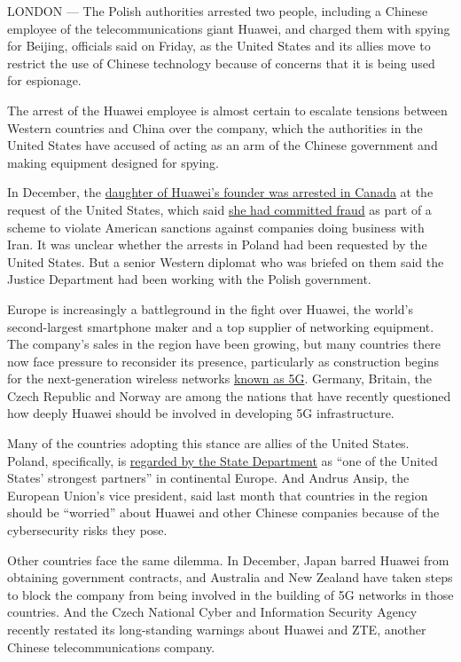 LONDON --- The Polish authorities arrested two people, including a
Chinese employee of the telecommunications giant Huawei, and charged
them with spying for Beijing, officials said on Friday, as the United
States and its allies move to restrict the use of Chinese technology
because of concerns that it is being used for espionage.

The arrest of the Huawei employee is almost certain to escalate tensions
between Western countries and China over the company, which the
authorities in the United States have accused of acting as an arm of the
Chinese government and making equipment designed for spying.

In December, the
\href{https://www.nytimes.com/2018/12/05/business/huawei-cfo-arrest-canada-extradition.html?module=inline}{daughter
of Huawei's founder was arrested in Canada} at the request of the United
States, which said
\href{https://www.nytimes.com/2018/12/07/technology/huawei-meng-wanzhou-fraud.html}{she
had committed fraud} as part of a scheme to violate American sanctions
against companies doing business with Iran. It was unclear whether the
arrests in Poland had been requested by the United States. But a senior
Western diplomat who was briefed on them said the Justice Department had
been working with the Polish government.

Europe is increasingly a battleground in the fight over Huawei, the
world's second-largest smartphone maker and a top supplier of networking
equipment. The company's sales in the region have been growing, but many
countries there now face pressure to reconsider its presence,
particularly as construction begins for the next-generation wireless
networks
\href{https://www.nytimes.com/2018/12/31/technology/personaltech/5g-what-you-need-to-know.html}{known
as 5G}. Germany, Britain, the Czech Republic and Norway are among the
nations that have recently questioned how deeply Huawei should be
involved in developing 5G infrastructure.

Many of the countries adopting this stance are allies of the United
States. Poland, specifically, is
\href{https://www.state.gov/r/pa/ei/bgn/2875.htm}{regarded by the State
Department} as ``one of the United States' strongest partners'' in
continental Europe. And Andrus Ansip, the European Union's vice
president, said last month that countries in the region should be
``worried'' about Huawei and other Chinese companies because of the
cybersecurity risks they pose.

Other countries face the same dilemma. In December, Japan barred Huawei
from obtaining government contracts, and Australia and New Zealand have
taken steps to block the company from being involved in the building of
5G networks in those countries. And the Czech National Cyber and
Information Security Agency recently restated its long-standing warnings
about Huawei and ZTE, another Chinese telecommunications company.

